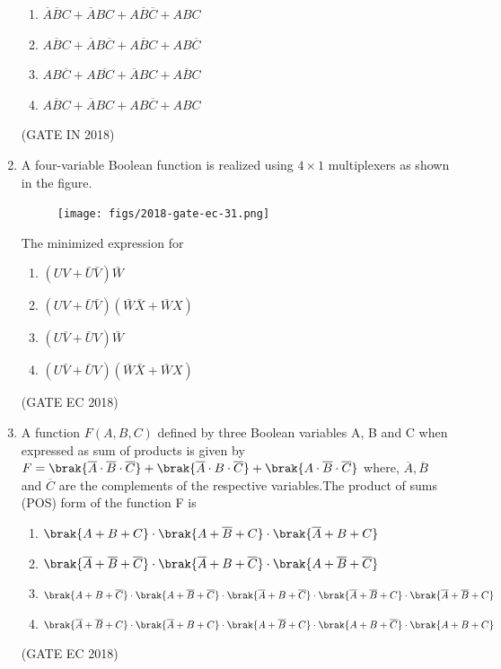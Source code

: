 \begin{enumerate}
\begin{enumerate}
            \item$\overline{A}\overline{B}C+\overline{A}BC+A\overline{B}\overline{C}+ABC$
            \item$\overline{ABC}+\overline{A}B\overline{C}+A\overline{B}C+AB\overline{C}$
            \item$A B\overline{C}+A\overline{B C}+\overline{A}B C+\overline{ABC}$
            \item$\overline{ABC}+\overline{A}BC+AB\overline{C}+ABC$
                  \end{enumerate}
		\hfill(GATE IN 2018)
\item
	\label{prob:gate EC 31}
	A four-variable Boolean function is realized using $4\times 1$ multiplexers as shown in the figure.
    \begin{figure}[!h]
        \centering
        \texttt{[image: figs/2018-gate-ec-31.png]}
        \caption{}
        \label{fig:mux}
    \end{figure}

   The minimized expression for 
    \begin{enumerate}
       \item $\left ( UV+\bar{U}\bar{V} \right )\bar{W}$
       \item $\left ( UV+\bar{U}\bar{V} \right )\left ( \bar{W}\bar{X}+\bar{W}X\right )$
       \item $\left ( U\bar{V}+\bar{U}V \right )\bar{W}$
       \item $\left ( U\bar{V}+\bar{U}V \right )\left ( \bar{W}\bar{X}+\bar{W}X\right )$

    \end{enumerate}
    \hfill(GATE EC 2018)

\item
	\label{prob:2023-gate-ec-9}
	A function $F(A, B, C)$ defined by three Boolean variables A, B and C when expressed as sum of products is given by \newline$ F = \brak{\overline{A} \cdot \overline{B} \cdot \overline{C}} + \brak{\overline{A} \cdot B \cdot \overline{C}} + \brak{A \cdot \overline{B} \cdot \overline{C}} $
where, $\overline{A},\overline{B}$ and $\overline{C}$ are the complements of the respective variables.The product of sums (POS) form of the function F is

\begin{enumerate}[label=(\Alph*)]
	\item $ \brak{A+B+C} \cdot \brak{A+\overline{B}+C} \cdot \brak{\overline{A}+B+C} $
 	\item $ \brak{\overline{A}+\overline{B}+\overline{C}} \cdot \brak{\overline{A}+B+\overline{C}} \cdot \brak{A+\overline{B}+\overline{C}} $
	\item $ \brak{A+B+\overline{C}} \cdot \brak{A+\overline{B}+\overline{C}} \cdot \brak{\overline{A}+B+\overline{C}} \cdot \brak{\overline{A}+\overline{B}+C} \cdot \brak{\overline{A}+\overline{B}+C} $
	\item $ \brak{\overline{A}+\overline{B}+C} \cdot \brak{\overline{A}+B+C} \cdot \brak{A+\overline{B}+C} \cdot \brak{A+B+\overline{C}} \cdot \brak{A+B+C} $
\end{enumerate}
\hfill(GATE EC 2018)


\end{enumerate}
